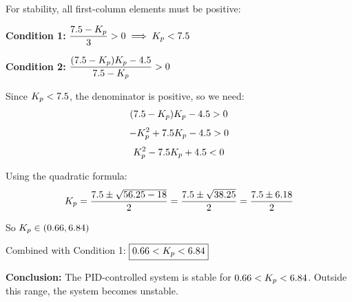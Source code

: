 \begin{example}
For stability, all first-column elements must be positive:

\textbf{Condition 1:} $\dfrac{7.5 - K_p}{3} > 0 \implies K_p < 7.5$

\textbf{Condition 2:} $\dfrac{(7.5-K_p)K_p - 4.5}{7.5 - K_p} > 0$

Since $K_p < 7.5$, the denominator is positive, so we need:
\begin{equation*}
(7.5 - K_p)K_p - 4.5 > 0
\end{equation*}
\begin{equation*}
-K_p^2 + 7.5K_p - 4.5 > 0
\end{equation*}
\begin{equation*}
K_p^2 - 7.5K_p + 4.5 < 0
\end{equation*}

Using the quadratic formula:
\begin{equation*}
K_p = \frac{7.5 \pm \sqrt{56.25 - 18}}{2} = \frac{7.5 \pm \sqrt{38.25}}{2} = \frac{7.5 \pm 6.18}{2}
\end{equation*}

So $K_p \in (0.66, 6.84)$

Combined with Condition 1: $\boxed{0.66 < K_p < 6.84}$

\textbf{Conclusion:} The PID-controlled system is stable for $0.66 < K_p < 6.84$. Outside this range, the system becomes unstable.
\end{example}

